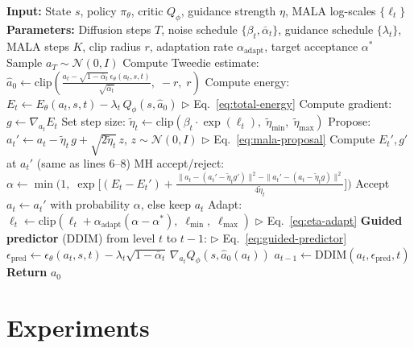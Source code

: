 \documentclass{article}
\theoremstyle{plain}
\theoremstyle{definition}
\theoremstyle{remark}
\begin{document}
\begin{algorithm}[t]
\caption{TiltedSample: MALA-Corrected Q-Guided Diffusion Sampling}
\label{alg:tilted-sampling}
\begin{algorithmic}[1]
\STATE \textbf{Input:} State $s$, policy $\pi_\theta$, critic $Q_\phi$, guidance strength $\eta$, MALA log-scales $\{\ell_t\}$
\STATE \textbf{Parameters:} Diffusion steps $T$, noise schedule $\{\beta_t, \bar{\alpha}_t\}$, guidance schedule $\{\lambda_t\}$, MALA steps $K$, clip radius $r$, adaptation rate $\alpha_{\text{adapt}}$, target acceptance $\alpha^*$
\STATE Sample $a_T \sim \mathcal{N}(0, I)$
    \STATE Compute Tweedie estimate: $\hat{a}_0 \leftarrow \text{clip}\!\left(\frac{a_t - \sqrt{1-\bar{\alpha}_t}\,\epsilon_\theta(a_t, s, t)}{\sqrt{\bar{\alpha}_t}},\; -r,\; r\right)$
    \STATE Compute energy: $E_t \leftarrow E_\theta(a_t, s, t) - \lambda_t \, Q_\phi(s, \hat{a}_0)$ \hfill $\triangleright$ Eq.~\ref{eq:total-energy}
    \STATE Compute gradient: $g \leftarrow \nabla_{a_t} E_t$
    \STATE Set step size: $\tilde{\eta}_t \leftarrow \text{clip}(\beta_t \cdot \exp(\ell_t),\; \tilde{\eta}_{\min},\; \tilde{\eta}_{\max})$
    \STATE Propose: $a_t' \leftarrow a_t - \tilde{\eta}_t \, g + \sqrt{2\tilde{\eta}_t}\, z$, \quad $z \sim \mathcal{N}(0,I)$ \hfill $\triangleright$ Eq.~\ref{eq:mala-proposal}
    \STATE Compute $E_t', g'$ at $a_t'$ (same as lines 6--8)
    \STATE MH accept/reject: $\alpha \leftarrow \min\!\big(1,\; \exp\!\big[(E_t {-} E_t') + \frac{\|a_t - (a_t' - \tilde{\eta}_t g')\|^2 - \|a_t' - (a_t - \tilde{\eta}_t g)\|^2}{4\tilde{\eta}_t}\big]\big)$
    \STATE Accept $a_t \leftarrow a_t'$ with probability $\alpha$, else keep $a_t$
    \STATE Adapt: $\ell_t \leftarrow \text{clip}(\ell_t + \alpha_{\text{adapt}}(\alpha - \alpha^*),\; \ell_{\min},\; \ell_{\max})$ \hfill $\triangleright$ Eq.~\ref{eq:eta-adapt}
  \ENDFOR
  \STATE \textbf{Guided predictor} (DDIM) from level $t$ to $t{-}1$: \hfill $\triangleright$ Eq.~\ref{eq:guided-predictor}
  \STATE \quad $\epsilon_{\text{pred}} \leftarrow \epsilon_\theta(a_t, s, t) - \lambda_t \sqrt{1{-}\bar{\alpha}_t} \, \nabla_{a_t} Q_\phi(s, \hat{a}_0(a_t))$
  \STATE \quad $a_{t-1} \leftarrow \text{DDIM}(a_t, \epsilon_{\text{pred}}, t)$
\ENDFOR
\STATE \textbf{Return} $a_0$
\end{algorithmic}
\end{algorithm}

\section{Experiments}
\label{sec:experiments}
\end{document}
